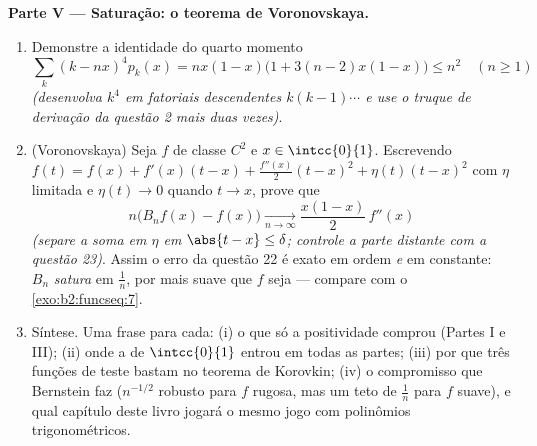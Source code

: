 \begin{problem}
\medskip
\noindent\textbf{Parte V --- Saturação: o teorema de
Voronovskaya.}
\begin{enumerate}[resume]
  \item Demonstre a identidade do quarto momento
        \[
        \sum_k (k - nx)^4 p_k(x)
        = nx(1-x)\bigl(1 + 3(n-2)x(1-x)\bigr) \leq n^2
        \quad (n \geq 1)
        \]
        \emph{(desenvolva $k^4$ em fatoriais descendentes $k(k-1)\cdots$
        e use o truque de derivação da questão 2 mais duas
        vezes)}.
  \item (Voronovskaya) Seja $f$ de classe $C^2$ e $x \in
        \intcc{0}{1}$. Escrevendo $f(t) = f(x) + f'(x)(t-x) +
        \frac{f''(x)}2(t-x)^2 + \eta(t)(t-x)^2$ com $\eta$
        limitada e $\eta(t) \to 0$ quando $t \to x$, prove que
        \[
        n\bigl(B_nf(x) - f(x)\bigr)
        \xrightarrow[n\to\infty]{}
        \frac{x(1-x)}{2}\,f''(x)
        \]
        \emph{(separe a soma em $\eta$ em $\abs{t - x} \leq
        \delta$; controle a parte distante com a questão 23)}. Assim
        o erro da questão 22 é exato em ordem \emph{e} em
        constante: $B_n$ \emph{satura} em $\frac1n$, por mais
        suave que $f$ seja --- compare com o
        \cref{exo:b2:funcseq:7}.
  \item Síntese. Uma frase para cada: (i) o que só a positividade
        comprou (Partes I e III); (ii) onde a 
        de $\intcc{0}{1}$ entrou em todas as partes; (iii) por que três
        funções de teste bastam no teorema de Korovkin; (iv) o
        compromisso que Bernstein faz ($n^{-1/2}$ robusto para $f$
        rugosa, mas um teto de $\frac1n$ para $f$ suave), e qual
        capítulo deste livro jogará o mesmo jogo com
        polinômios trigonométricos.
\end{enumerate}
\end{problem}
